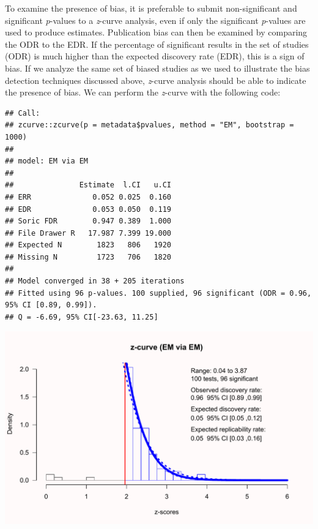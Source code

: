 \documentclass[
  oneside]{krantz}
\makeatletter
\newenvironment{Shaded}{\begin{snugshade}}{\end{snugshade}}
\newcommand{\AttributeTok}[1]{\textcolor[rgb]{0.61,0.61,0.61}{#1}}
\newcommand{\ConstantTok}[1]{\textcolor[rgb]{0,0,0}{#1}}
\newcommand{\DecValTok}[1]{\textcolor[rgb]{0.06,0.06,0.06}{#1}}
\newcommand{\FunctionTok}[1]{\textcolor[rgb]{0,0,0}{#1}}
\newcommand{\NormalTok}[1]{#1}
\newcommand{\OtherTok}[1]{\textcolor[rgb]{0.37,0.37,0.37}{#1}}
\newcommand{\SpecialCharTok}[1]{\textcolor[rgb]{0,0,0}{#1}}
\newcommand{\StringTok}[1]{\textcolor[rgb]{0.5,0.5,0.5}{#1}}
\newenvironment{kframe}{%
\medskip{}
\setlength{\fboxsep}{.8em}
 \def\at@end@of@kframe{}%
 \ifinner\ifhmode%
  \def\at@end@of@kframe{\end{minipage}}%
  \begin{minipage}{\columnwidth}%
 \fi\fi%
 \def\FrameCommand##1{\hskip\@totalleftmargin \hskip-\fboxsep
 \colorbox{shadecolor}{##1}\hskip-\fboxsep
     \hskip-\linewidth \hskip-\@totalleftmargin \hskip\columnwidth}%
 \MakeFramed {\advance\hsize-\width
   \@totalleftmargin\z@ \linewidth\hsize
   \@setminipage}}%
 {\par\unskip\endMakeFramed%
 \at@end@of@kframe}
\renewenvironment{Shaded}{\begin{kframe}}{\end{kframe}}
\makeatother
\begin{document}
To examine the presence of bias, it is preferable to submit non-significant and significant \emph{p}-values to a \emph{z}-curve analysis, even if only the significant \emph{p}-values are used to produce estimates. Publication bias can then be examined by comparing the ODR to the EDR. If the percentage of significant results in the set of studies (ODR) is much higher than the expected discovery rate (EDR), this is a sign of bias. If we analyze the same set of biased studies as we used to illustrate the bias detection techniques discussed above, \emph{z}-curve analysis should be able to indicate the presence of bias. We can perform the \emph{z}-curve with the following code:

\begin{Shaded}
\end{Shaded}

\begin{verbatim}
## Call:
## zcurve::zcurve(p = metadata$pvalues, method = "EM", bootstrap = 1000)
## 
## model: EM via EM
## 
##               Estimate  l.CI   u.CI
## ERR              0.052 0.025  0.160
## EDR              0.053 0.050  0.119
## Soric FDR        0.947 0.389  1.000
## File Drawer R   17.987 7.399 19.000
## Expected N        1823   806   1920
## Missing N         1723   706   1820
## 
## Model converged in 38 + 205 iterations
## Fitted using 96 p-values. 100 supplied, 96 significant (ODR = 0.96, 95% CI [0.89, 0.99]).
## Q = -6.69, 95% CI[-23.63, 11.25]
\end{verbatim}

\begin{center}\includegraphics[width=1\linewidth]{12-bias_files/figure-latex/unnamed-chunk-4-1} \end{center}
\end{document}
